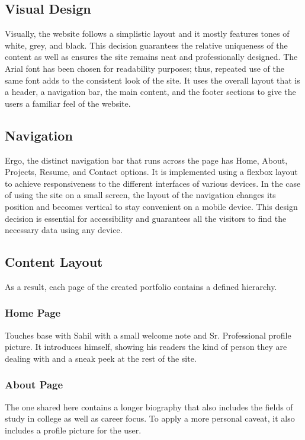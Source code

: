 \documentclass{article}
\begin{document}
\subsection{Visual Design}
Visually, the website follows a simplistic layout and it mostly features tones of white, grey, and black. This decision guarantees the relative uniqueness of the content as well as ensures the site remains neat and professionally designed. The Arial font has been chosen for readability purposes; thus, repeated use of the same font adds to the consistent look of the site. It uses the overall layout that is a header, a navigation bar, the main content, and the footer sections to give the users a familiar feel of the website. 

\subsection{Navigation}
Ergo, the distinct navigation bar that runs across the page has Home, About, Projects, Resume, and Contact options. It is implemented using a flexbox layout to achieve responsiveness to the different interfaces of various devices. In the case of using the site on a small screen, the layout of the navigation changes its position and becomes vertical to stay convenient on a mobile device. This design decision is essential for accessibility and guarantees all the visitors to find the necessary data using any device. 

\subsection{Content Layout}
As a result, each page of the created portfolio contains a defined hierarchy. 

\subsubsection{Home Page}
Touches base with Sahil with a small welcome note and Sr. Professional profile picture. It introduces himself, showing his readers the kind of person they are dealing with and a sneak peek at the rest of the site. 

\subsubsection{About Page}
The one shared here contains a longer biography that also includes the fields of study in college as well as career focus. To apply a more personal caveat, it also includes a profile picture for the user. 
\end{document}
